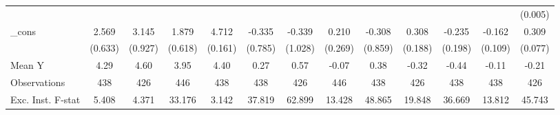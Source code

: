 {\begin{tabular}{l*{12}{c}}
            &                     &                     &                     &                     &                     &                     &                     &                     &                     &                     &                     &     (0.005)         \\
\addlinespace
\_cons      &       2.569\sym{***}&       3.145\sym{***}&       1.879\sym{***}&       4.712\sym{***}&      -0.335         &      -0.339         &       0.210         &      -0.308         &       0.308         &      -0.235         &      -0.162         &       0.309\sym{***}\\
            &     (0.633)         &     (0.927)         &     (0.618)         &     (0.161)         &     (0.785)         &     (1.028)         &     (0.269)         &     (0.859)         &     (0.188)         &     (0.198)         &     (0.109)         &     (0.077)         \\
\midrule
Mean Y      &        4.29         &        4.60         &        3.95         &        4.40         &        0.27         &        0.57         &       -0.07         &        0.38         &       -0.32         &       -0.44         &       -0.11         &       -0.21         \\
Observations&         438         &         426         &         446         &         438         &         438         &         426         &         446         &         438         &         426         &         438         &         438         &         426         \\
Exc. Inst. F-stat&       5.408         &       4.371         &      33.176         &       3.142         &      37.819         &      62.899         &      13.428         &      48.865         &      19.848         &      36.669         &      13.812         &      45.743         \\
\bottomrule
\end{tabular}
}
